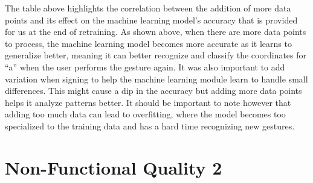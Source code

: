\documentclass[12pt, titlepage]{article}
\begin{document}
The table above highlights the correlation between the addition of more data points and its effect 
on the machine learning model’s accuracy that is provided for us at the end of retraining. 
As shown above, when there are more data points to process, the machine learning model becomes 
more accurate as it learns to generalize better, meaning it can better recognize and classify 
the coordinates for “a” when the user performs the gesture again. It was also important to add 
variation when signing to help the machine learning module learn to handle small differences. 
This might cause a dip in the accuracy but adding more data points helps it analyze patterns better. 
It should be important to note however that adding too much data can lead to overfitting, where the 
model becomes too specialized to the training data and has a hard time recognizing new gestures.

\newpage
\section{Non-Functional Quality 2}
\end{document}
